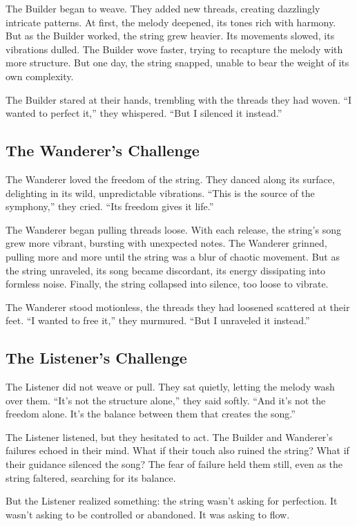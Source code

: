 \documentclass[12pt]{article}
\begin{document}
The Builder began to weave. They added new threads, creating dazzlingly intricate patterns. At first, the melody deepened, its tones rich with harmony. But as the Builder worked, the string grew heavier. Its movements slowed, its vibrations dulled. The Builder wove faster, trying to recapture the melody with more structure. But one day, the string snapped, unable to bear the weight of its own complexity.

The Builder stared at their hands, trembling with the threads they had woven. “I wanted to perfect it,” they whispered. “But I silenced it instead.”

\subsection*{The Wanderer’s Challenge}
The Wanderer loved the freedom of the string. They danced along its surface, delighting in its wild, unpredictable vibrations. “This is the source of the symphony,” they cried. “Its freedom gives it life.”

The Wanderer began pulling threads loose. With each release, the string’s song grew more vibrant, bursting with unexpected notes. The Wanderer grinned, pulling more and more until the string was a blur of chaotic movement. But as the string unraveled, its song became discordant, its energy dissipating into formless noise. Finally, the string collapsed into silence, too loose to vibrate.

The Wanderer stood motionless, the threads they had loosened scattered at their feet. “I wanted to free it,” they murmured. “But I unraveled it instead.”

\subsection*{The Listener’s Challenge}
The Listener did not weave or pull. They sat quietly, letting the melody wash over them. “It’s not the structure alone,” they said softly. “And it’s not the freedom alone. It’s the balance between them that creates the song.”

The Listener listened, but they hesitated to act. The Builder and Wanderer’s failures echoed in their mind. What if their touch also ruined the string? What if their guidance silenced the song? The fear of failure held them still, even as the string faltered, searching for its balance.

But the Listener realized something: the string wasn’t asking for perfection. It wasn’t asking to be controlled or abandoned. It was asking to flow.
\end{document}

